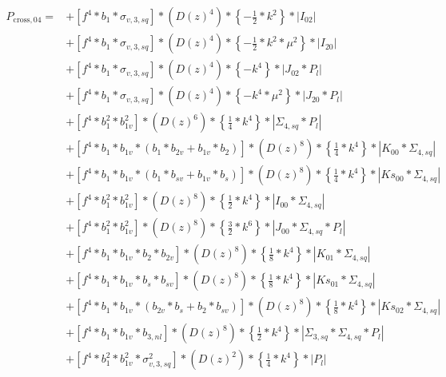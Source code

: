 \documentclass{article}
\begin{document}
\begin{equation}
\begin{aligned} 
P_{\mathrm{cross},04}=
&+\left[f^{4}*b_{1}*\sigma_{v,3,sq}\right]*\left(D(z)^{4}\right)*\left\{-\frac{1}{2}*k^{2}\right\}*\left|I_{02}\right| \\
&+\left[f^{4}*b_{1}*\sigma_{v,3,sq}\right]*\left(D(z)^{4}\right)*\left\{-\frac{1}{2}*k^{2}*\mu^{2}\right\}*\left|I_{20}\right| \\
&+\left[f^{4}*b_{1}*\sigma_{v,3,sq}\right]*\left(D(z)^{4}\right)*\left\{-k^{4}\right\}*\left|J_{02}*P_l\right| \\
&+\left[f^{4}*b_{1}*\sigma_{v,3,sq}\right]*\left(D(z)^{4}\right)*\left\{-k^{4}*\mu^{2}\right\}*\left|J_{20}*P_l\right| \\
&+\left[f^{4}*b_{1}^{2}*b_{1v}^{2}\right]*\left(D(z)^{6}\right)*\left\{\frac{1}{4}*k^{4}\right\}*\left|\Sigma_{4,sq}*P_l\right| \\
&+\left[f^{4}*b_{1}*b_{1v}*(b_{1}*b_{2v} + b_{1v}*b_{2})\right]*\left(D(z)^{8}\right)*\left\{\frac{1}{4}*k^{4}\right\}*\left|K_{00}*\Sigma_{4,sq}\right| \\
&+\left[f^{4}*b_{1}*b_{1v}*(b_{1}*b_{sv} + b_{1v}*b_{s})\right]*\left(D(z)^{8}\right)*\left\{\frac{1}{4}*k^{4}\right\}*\left|Ks_{00}*\Sigma_{4,sq}\right| \\
&+\left[f^{4}*b_{1}^{2}*b_{1v}^{2}\right]*\left(D(z)^{8}\right)*\left\{\frac{1}{2}*k^{4}\right\}*\left|I_{00}*\Sigma_{4,sq}\right| \\
&+\left[f^{4}*b_{1}^{2}*b_{1v}^{2}\right]*\left(D(z)^{8}\right)*\left\{\frac{3}{2}*k^{6}\right\}*\left|J_{00}*\Sigma_{4,sq}*P_l\right| \\
&+\left[f^{4}*b_{1}*b_{1v}*b_{2}*b_{2v}\right]*\left(D(z)^{8}\right)*\left\{\frac{1}{8}*k^{4}\right\}*\left|K_{01}*\Sigma_{4,sq}\right| \\
&+\left[f^{4}*b_{1}*b_{1v}*b_{s}*b_{sv}\right]*\left(D(z)^{8}\right)*\left\{\frac{1}{8}*k^{4}\right\}*\left|Ks_{01}*\Sigma_{4,sq}\right| \\
&+\left[f^{4}*b_{1}*b_{1v}*(b_{2v}*b_{s} + b_{2}*b_{sv})\right]*\left(D(z)^{8}\right)*\left\{\frac{1}{8}*k^{4}\right\}*\left|Ks_{02}*\Sigma_{4,sq}\right| \\
&+\left[f^{4}*b_{1}*b_{1v}*b_{3,nl}\right]*\left(D(z)^{8}\right)*\left\{\frac{1}{2}*k^{4}\right\}*\left|\Sigma_{3,sq}*\Sigma_{4,sq}*P_l\right| \\
&+\left[f^{4}*b_{1}^{2}*b_{1v}^{2}*\sigma_{v,3,sq}^{2}\right]*\left(D(z)^{2}\right)*\left\{\frac{1}{4}*k^{4}\right\}*\left|P_l\right| \\

\end{aligned}
\end{equation}
\end{document}
